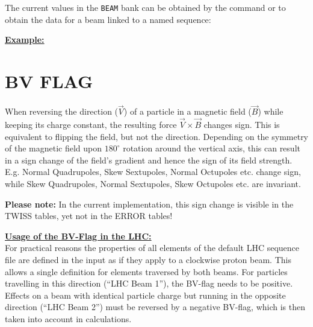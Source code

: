 The current values in the \texttt{BEAM} bank can be obtained by the command
or to obtain the data for a beam linked to a named sequence:


\textbf{\underline{Example:}} 





\section{BV FLAG}
\label{sec:bvflag}
When reversing the direction ($\vec V$) of a particle in a magnetic field
($\vec B$) while keeping its charge constant, 
the resulting force $\vec V \times \vec B$ changes sign. 
This is equivalent to flipping the field, but not the direction.
Depending on the symmetry of the magnetic field upon $180^{\circ}$ rotation around the vertical axis,
this can result in a sign change of the field's gradient and hence the sign of its field strength.
E.g. Normal Quadrupoles, Skew Sextupoles, Normal Octupoles etc. change sign, while 
Skew Quadrupoles, Normal Sextupoles, Skew Octupoles etc. are invariant.

\textbf{Please note:} In the current implementation, this sign change is visible in the TWISS tables, yet not in the ERROR tables!

\textbf{\underline{Usage of the BV-Flag in the LHC:}}\\ 
For practical reasons the properties of all elements of the default LHC sequence file are
defined in the \madx input as if they apply to a clockwise proton beam.
This allows a single definition for elements traversed by both beams.
For particles travelling in this direction (``LHC Beam 1''), the BV-flag needs to be positive.
Effects on a beam with identical particle charge but running in the opposite direction (``LHC Beam 2'')
must be reversed by a negative BV-flag, which is then taken into account in calculations. 


